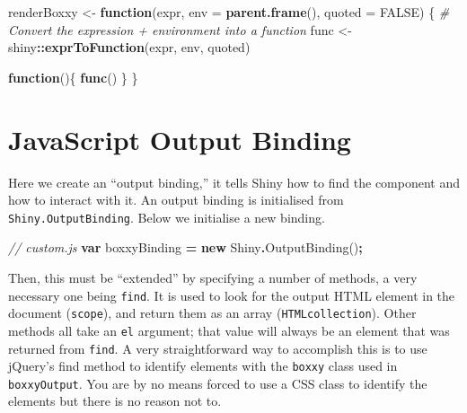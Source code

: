 \documentclass[
]{krantz}
\makeatletter
\newenvironment{Shaded}{\begin{snugshade}}{\end{snugshade}}
\newcommand{\CommentTok}[1]{\textcolor[rgb]{0.37,0.37,0.37}{\textit{#1}}}
\newcommand{\ControlFlowTok}[1]{\textcolor[rgb]{0.27,0.27,0.27}{\textbf{#1}}}
\newcommand{\DataTypeTok}[1]{\textcolor[rgb]{0.27,0.27,0.27}{#1}}
\newcommand{\FunctionTok}[1]{\textcolor[rgb]{0,0,0}{#1}}
\newcommand{\KeywordTok}[1]{\textcolor[rgb]{0.27,0.27,0.27}{\textbf{#1}}}
\newcommand{\NormalTok}[1]{#1}
\newcommand{\OperatorTok}[1]{\textcolor[rgb]{0.43,0.43,0.43}{\textbf{#1}}}
\newcommand{\OtherTok}[1]{\textcolor[rgb]{0.37,0.37,0.37}{#1}}
\newcommand{\StringTok}[1]{\textcolor[rgb]{0.5,0.5,0.5}{#1}}
\newenvironment{kframe}{%
\medskip{}
\setlength{\fboxsep}{.8em}
 \def\at@end@of@kframe{}%
 \ifinner\ifhmode%
  \def\at@end@of@kframe{\end{minipage}}%
  \begin{minipage}{\columnwidth}%
 \fi\fi%
 \def\FrameCommand##1{\hskip\@totalleftmargin \hskip-\fboxsep
 \colorbox{shadecolor}{##1}\hskip-\fboxsep
     \hskip-\linewidth \hskip-\@totalleftmargin \hskip\columnwidth}%
 \MakeFramed {\advance\hsize-\width
   \@totalleftmargin\z@ \linewidth\hsize
   \@setminipage}}%
 {\par\unskip\endMakeFramed%
 \at@end@of@kframe}
\renewenvironment{Shaded}{\begin{kframe}}{\end{kframe}}
\makeatother
\begin{document}
\begin{Shaded}
\begin{Highlighting}[]
\NormalTok{renderBoxxy \textless{}{-}}\StringTok{ }\ControlFlowTok{function}\NormalTok{(expr, }\DataTypeTok{env =} \KeywordTok{parent.frame}\NormalTok{(), }
  \DataTypeTok{quoted =} \OtherTok{FALSE}\NormalTok{) \{}
  \CommentTok{\# Convert the expression + environment into a function}
\NormalTok{  func \textless{}{-}}\StringTok{ }\NormalTok{shiny}\OperatorTok{::}\KeywordTok{exprToFunction}\NormalTok{(expr, env, quoted)}

  \ControlFlowTok{function}\NormalTok{()\{}
    \KeywordTok{func}\NormalTok{()}
\NormalTok{  \}}
\NormalTok{\}}
\end{Highlighting}
\end{Shaded}

\hypertarget{shiny-output-binding}{%
\section{JavaScript Output Binding}\label{shiny-output-binding}}

Here we create an ``output binding,'' it tells Shiny how to find the component and how to interact with it. An output binding is initialised from \texttt{Shiny.OutputBinding}. Below we initialise a new binding.

\begin{Shaded}
\begin{Highlighting}[]
\CommentTok{// custom.js}
\KeywordTok{var}\NormalTok{ boxxyBinding }\OperatorTok{=} \KeywordTok{new}\NormalTok{ Shiny}\OperatorTok{.}\FunctionTok{OutputBinding}\NormalTok{()}\OperatorTok{;}
\end{Highlighting}
\end{Shaded}

Then, this must be ``extended'' by specifying a number of methods, a very necessary one being \texttt{find}. It is used to look for the output HTML element in the document (\texttt{scope}), and return them as an array (\texttt{HTMLcollection}). Other methods all take an \texttt{el} argument; that value will always be an element that was returned from \texttt{find}. A very straightforward way to accomplish this is to use jQuery's find method to identify elements with the \texttt{boxxy} class used in \texttt{boxxyOutput}. You are by no means forced to use a CSS class to identify the elements but there is no reason not to.
\end{document}
